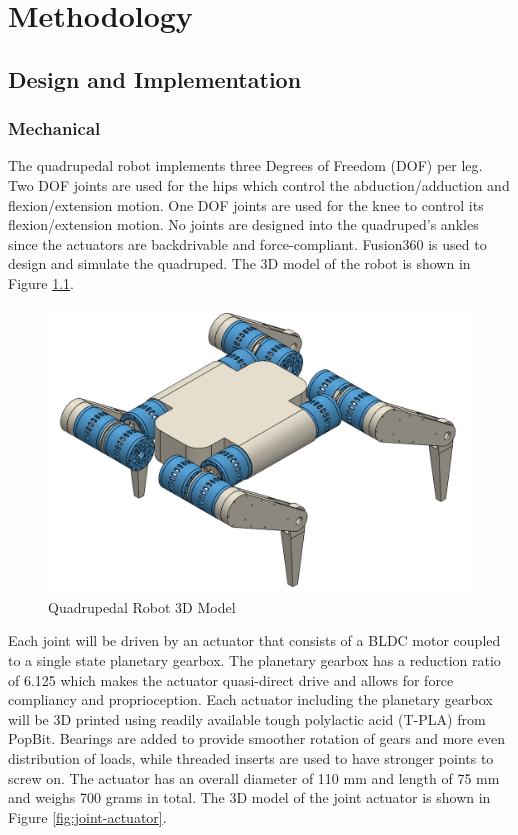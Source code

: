 \documentclass[english]{upeeei}
\begin{document}
\chapter{Methodology\label{cha:Methodology}}

\section{Design and Implementation}
\subsection{Mechanical}

The quadrupedal robot implements three Degrees of Freedom (DOF) per leg. Two DOF joints are used for the hips which control the abduction/adduction and flexion/extension motion. One DOF joints are used for the knee to control its flexion/extension motion. No joints are designed into the quadruped's ankles since the actuators are backdrivable and force-compliant.  Fusion360 is used to design and simulate the quadruped. The 3D model of the robot is shown in Figure \ref{fig:open-cauchy}.

\begin{figure}[H]
\begin{centering}
\includegraphics[width=0.7\columnwidth]{images/open_cauchy}
\par\end{centering}
\caption{Quadrupedal Robot 3D Model\label{fig:open-cauchy}}
\end{figure}

Each joint will be driven by an actuator that consists of a BLDC motor coupled to a single state planetary gearbox. The planetary gearbox has a reduction ratio of 6.125 which makes the actuator quasi-direct drive and allows for force compliancy and proprioception. Each actuator including the planetary gearbox will be 3D printed using readily available tough polylactic acid (T-PLA) from PopBit. Bearings are added to provide smoother rotation of gears and more even distribution of loads, while threaded inserts are used to have stronger points to screw on. The actuator has an overall diameter of 110 mm and length of 75 mm and weighs 700 grams in total. The 3D model of the joint actuator is shown in Figure \ref{fig:joint-actuator}.
\end{document}
